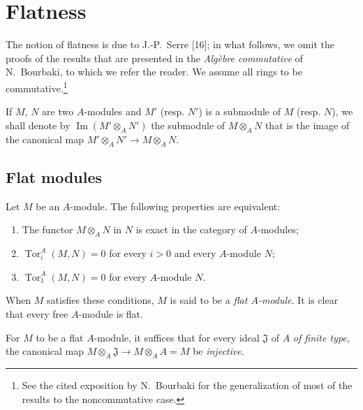 \section{Flatness}
\label{section:0.6}

\begin{env}[6.0]
The notion of flatness is due to J.-P.~Serre [16]; in what follows, we omit
the proofs of the results that are presented in the \emph{Algèbre
commutative} of N.~Bourbaki, to which we refer the reader. We
assume all rings to be commutative.\footnote{See the cited exposition by
N.~Bourbaki for the generalization of most of the results to the
noncommutative case.}


If $M$, $N$ are two $A$-modules and $M'$ (resp. $N'$) is a submodule of $M$
(resp. $N$), we shall denote by $\operatorname{Im}(M'\otimes_A N')$ the submodule
of $M\otimes_A N$ that is the image of the canonical map
$M'\otimes_A N'\to M\otimes_A N$.
\end{env}

\subsection{Flat modules}
\label{subsection:0.6.1}

\begin{env}[6.1.1]
\label{0.6.1.1}
Let $M$ be an $A$-module. The following properties are equivalent:
\begin{enumerate}
  \item[$a)$] The functor $M\otimes_A N$ in $N$ is exact in the category
    of $A$-modules;
  \item[$b)$] $\operatorname{Tor}_i^A(M,N)=0$ for every $i>0$ and every
    $A$-module $N$;
  \item[$c)$] $\operatorname{Tor}_1^A(M,N)=0$ for every $A$-module $N$.
\end{enumerate}

When $M$ satisfies these conditions, $M$ is said to be a
\emph{flat $A$-module}. It is clear that every free $A$-module is flat.

For $M$ to be a flat $A$-module, it suffices that for every ideal
$\mathfrak{J}$ of $A$ \emph{of finite type}, the canonical map
$M\otimes_A\mathfrak{J}\to M\otimes_A A=M$ be \emph{injective}.
\end{env}

